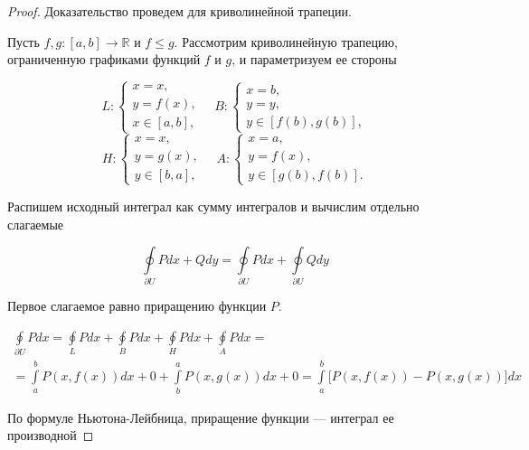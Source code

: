 \documentclass[a5paper]{article}
\theoremstyle{plain}
\theoremstyle{definition}
\numberwithin{through}{section}
\numberwithin{equation}{section}
\begin{document}
\begin{proof}
	Доказательство проведем для криволинейной трапеции.
	
	Пусть $f,g :[a,b] \to \mathbb{R}$ и $f\leq g$. Рассмотрим криволинейную трапецию, ограниченную графиками функций $f$ и $g$, и параметризуем ее стороны
	
	\begin{equation*}
	L: 
	\begin{cases}
	x = x, \\
	y = f(x), \\
	x \in [a, b],
	\end{cases}
	\quad
	B: 
	\begin{cases}
	x = b, \\
	y = y, \\
	y \in [f(b), g(b)],
	\end{cases}
	\end{equation*}
	\begin{equation*}
		H: 
		\begin{cases}
		x = x, \\
		y = g(x), \\
		y \in [b, a],
		\end{cases}
		\quad
		A: 
		\begin{cases}
		x = a, \\
		y = f(x), \\
		y \in [g(b), f(b)].
		\end{cases}
	\end{equation*}
	
	Распишем исходный интеграл как сумму интегралов и вычислим отдельно слагаемые
	
	\begin{equation*}
	\oint\limits_{\partial U} Pdx + Qdy = \oint\limits_{\partial U} Pdx + \oint\limits_{\partial U} Qdy
	\end{equation*}
	
	Первое слагаемое равно приращению функции $P$.
	
	\begin{align*}
	\oint\limits_{\partial U} Pdx = \oint\limits_{L} Pdx + \oint\limits_{B} Pdx + \oint\limits_{H} Pdx + \oint\limits_{A} Pdx = \\ =\int\limits_{a}^{b} P(x, f(x))dx + 0 + \int\limits_{b}^{a} P(x, g(x))dx + 0 = \int\limits_{a}^{b} \bigg[P(x, f(x)) - P(x, g(x))\bigg] dx
	\end{align*}
	
	По формуле Ньютона-Лейбница, приращение функции --- интеграл ее производной
	

\end{proof}
\end{document}
